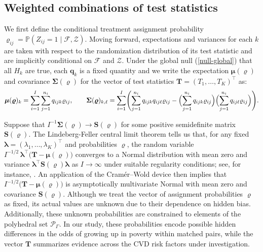 \documentclass[12pt,leqno,titlepage]{amsart}
\renewcommand{\P}{\mathbb{P}}
\newcommand{\1}{\mathbbm{1}}
\begin{document}
\begin{bibunit}
\subsection{Weighted combinations of test statistics} \label{subsec:weighted-stats}

We first define the conditional treatment assignment probability $\varrho_{ij} = \P(Z_{ij} = 1 \mid \mathcal{F}, \mathcal{Z})$. Moving forward, expectations and variances for each $k$ are taken with respect to the randomization distribution of its test statistic and are implicitly conditional on $\mathcal{F}$ and $\mathcal{Z}$.
Under the global null (\ref{null-global}) that all $H_k$ are true, each $\mathbf{q}_k$ is a fixed quantity and we write the expectation $\boldsymbol{\mu}(\boldsymbol{\varrho})$ and covariance $\boldsymbol{\Sigma}(\boldsymbol{\varrho})$ for the vector of test statistics $\mathbf{T} = (T_1, \ldots, T_K)^\top$ as:
\begin{equation} \label{expectation-covariance}
\boldsymbol{\mu}(\boldsymbol{\varrho})_k 
= 
\sum_{i=1}^I \sum_{j=1}^{n_i} q_{ijk} \varrho_{ij}, 
\qquad
\boldsymbol{\Sigma}(\boldsymbol{\varrho})_{k,\ell} 
=
\sum_{i=1}^I \Biggl(
\sum_{j=1}^{n_i} q_{ijk} q_{ij\ell} \varrho_{ij}
-
\Bigl(\sum_{j=1}^{n_i} q_{ijk} \varrho_{ij}\Bigr)
\Bigl(\sum_{j=1}^{n_i} q_{ij\ell} \varrho_{ij}\Bigr)
\Biggr).
\end{equation}

Suppose that
$
I^{-1}\boldsymbol{\Sigma}(\boldsymbol{\varrho})\to \mathbf{S}(\boldsymbol{\varrho})
$
for some positive semidefinite matrix $\mathbf{S}(\boldsymbol{\varrho})$. The Lindeberg-Feller central limit theorem tells us that, for any fixed $\boldsymbol{\lambda} = (\lambda_1, \ldots, \lambda_K)^\top$ and probabilities $\boldsymbol{\varrho}$, the random variable $I^{-1/2}\,\boldsymbol{\lambda}^\top\bigl(\mathbf T-\boldsymbol{\mu}(\boldsymbol{\varrho})\bigr)$ converges to a Normal distribution with mean zero and variance $\boldsymbol{\lambda}^\top \mathbf{S}(\boldsymbol{\varrho})\boldsymbol{\lambda}$ as $I \rightarrow \infty$ under suitable regularity conditions; see, for instance, \cite[\S 8.10]{rosenbaum2025introduction}. An application of the Cramér--Wold device then implies that $I^{-1/2}\bigl( \mathbf{T}-\boldsymbol{\mu}(\boldsymbol{\varrho})\bigr)$ is asymptotically multivariate Normal with mean zero and covariance $\mathbf{S}(\boldsymbol{\varrho})$. Although we treat the vector of assignment probabilities $\boldsymbol{\varrho}$ as fixed, its actual values are unknown due to their dependence on hidden bias. Additionally, these unknown probabilities are constrained to elements of the polyhedral set $\mathcal{P}_{\Gamma}$. In our study, these probabilities encode possible hidden differences in the odds of growing up in poverty within matched pairs, while the vector $\mathbf T$ summarizes evidence across the CVD risk factors under investigation.



\end{bibunit}
\end{document}
